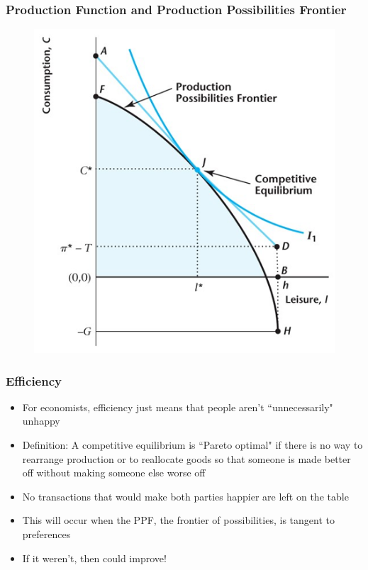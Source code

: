 \documentclass{beamer}
\begin{document}
\begin{frame}
\frametitle[alignment=center]{Production Function and Production Possibilities Frontier}
\begin{figure}
\centering
\includegraphics[scale=0.5]{Figures/W_Fig_5pt3.png}
\end{figure}
\end{frame}


\begin{frame}
\frametitle[alignment=center]{Efficiency}
\begin{itemize}
\item For economists, efficiency just means that people aren't ``unnecessarily" unhappy
\bigskip
\item Definition:  A competitive equilibrium is ``Pareto optimal" if there is no way to rearrange production or to reallocate goods so that someone is made better off without making someone else worse off
\bigskip
\item No transactions that would make both parties happier are left on the table
\bigskip
\item This will occur when the PPF, the frontier of possibilities, is tangent to preferences
\bigskip
\item If it weren't, then could improve! 
\end{itemize}
\end{frame}
\end{document}
